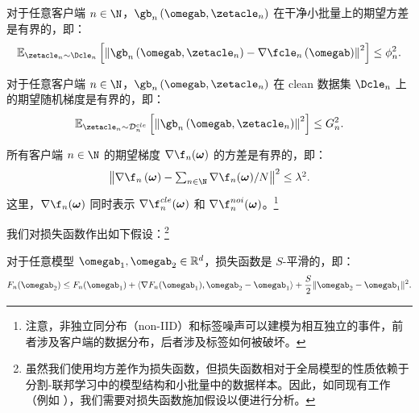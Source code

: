 \begin{assumption}[均方误差下随机梯度的方差]\label{ass:gradient-variance}
对于任意客户端 $n\in\N$，$\gb_n\left(\omegab,\zetacle_n\right)$ 在干净小批量上的期望方差是有界的，即：
\begin{equation}\label{eq:gradient-variance}
    \mathbb{E}_{\zetacle_n\sim \Dcle_n}\left[\left\Vert \gb_n\left(\omegab,\zetacle_n\right) - \nabla \fcle_n\left(\omegab\right) \right\Vert^2 \right] \leq \phi_n^2.
\end{equation}
\end{assumption}

\begin{assumption}[均方误差下的随机梯度]\label{ass:gradient}
对于任意客户端 $n\in\N$，$\gb_n\left(\omegab,\zetacle_n\right)$ 在 clean 数据集 $\Dcle_n$ 上的期望随机梯度是有界的，即：
\begin{equation}\label{eq:gradient}
\mathbb{E}_{\zetacle_n\sim \mathcal{D}_n^{cle}}\left[\left\Vert \gb_n\left(\omegab, \zetacle_n\right) \right\Vert^2\right] \leq G_n^2.
\end{equation}
\end{assumption}

\begin{assumption}[数据异构性]\label{ass:heter}
所有客户端 $n\in\N$ 的期望梯度 $\nabla \f_n(\boldsymbol{\omega})$ 的方差是有界的，即：
\begin{equation}
\textstyle \left\Vert 
\nabla \f_n\left(\boldsymbol{\omega}\right)- \sum_{n\in\N}
\nabla\f_n(\boldsymbol{\omega})/N \right\Vert^2 \le \lambda^2.
\end{equation}
这里，$\nabla \f_n(\boldsymbol{\omega})$ 同时表示 $\nabla \f_n^{cle}(\boldsymbol{\omega})$ 和 $\nabla \f_n^{noi}(\boldsymbol{\omega})$。\footnote{注意，非独立同分布（non-IID）和标签噪声可以建模为相互独立的事件，前者涉及客户端的数据分布，后者涉及标签如何被破坏。}

\end{assumption}

我们对损失函数作出如下假设：\footnote{虽然我们使用均方差作为损失函数，但损失函数相对于全局模型的性质依赖于分割-联邦学习中的模型结构和小批量中的数据样本。因此，如同现有工作（例如 \cite{b4,b11,b8}），我们需要对损失函数施加假设以便进行分析。}

\begin{assumption}[$S$-平滑性]\label{ass:smooth}
对于任意模型 $\omegab_1, \omegab_2\in \mathbb{R}^d$，损失函数是 $S$-平滑的，即：
$$
F_n(\omegab_2) \leq F_n(\omegab_1)+\langle \nabla F_n(\omegab_1), \omegab_2-\omegab_1\rangle +\frac{S}{2}\|\omegab_2-\omegab_1\|^2.
$$
\end{assumption}

